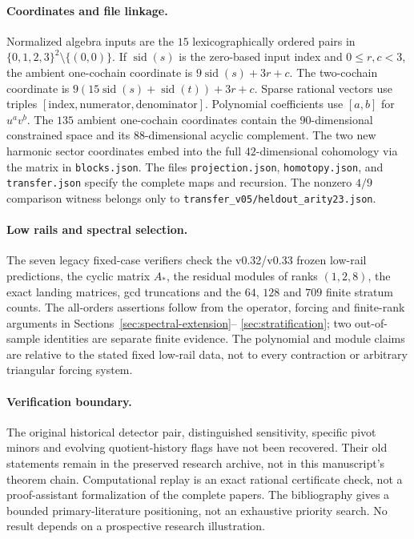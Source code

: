 \documentclass[11pt]{amsart}
\begin{document}
\paragraph{Coordinates and file linkage.}
Normalized algebra inputs are the $15$ lexicographically ordered pairs
in $\{0,1,2,3\}^2\setminus\{(0,0)\}$.
If $\operatorname{sid}(s)$ is the zero-based input index and $0\le r,c<3$,
the ambient one-cochain coordinate is
$9\operatorname{sid}(s)+3r+c$.
The two-cochain coordinate is
$9(15\operatorname{sid}(s)+\operatorname{sid}(t))+3r+c$.
Sparse rational vectors use triples $[\text{index},\text{numerator},\text{denominator}]$.
Polynomial coefficients use $[a,b]$ for $u^av^b$.
The $135$ ambient one-cochain coordinates contain the $90$-dimensional constrained
space and its $88$-dimensional acyclic complement.
The two new harmonic sector coordinates embed into the full $42$-dimensional
cohomology via the matrix in \texttt{blocks.json}.
The files \texttt{projection.json}, \texttt{homotopy.json}, and
\texttt{transfer.json} specify the complete maps and recursion.
The nonzero $4/9$ comparison witness belongs only to
\texttt{transfer\_v05/heldout\_arity23.json}.

\paragraph{Low rails and spectral selection.}
The seven legacy fixed-case verifiers check the v0.32/v0.33 frozen low-rail
predictions, the cyclic matrix $A_*$, the residual modules of ranks $(1,2,8)$,
the exact landing matrices, gcd truncations and the $64$, $128$ and $709$
finite stratum counts. The all-orders assertions follow from the operator,
forcing and finite-rank arguments in Sections~\ref{sec:spectral-extension}--%
\ref{sec:stratification}; two out-of-sample identities are separate finite evidence.
The polynomial and module claims are relative to the stated fixed low-rail
data, not to every contraction or arbitrary triangular forcing system.

\paragraph{Verification boundary.}
The original historical detector pair, distinguished sensitivity, specific pivot
minors and evolving quotient-history flags have not been recovered.
Their old statements remain in the preserved research archive, not in this
manuscript's theorem chain. Computational replay is an exact rational certificate
check, not a proof-assistant formalization of the complete papers.
The bibliography gives a bounded primary-literature positioning, not an exhaustive
priority search. No result depends on a prospective research illustration.
\end{document}
